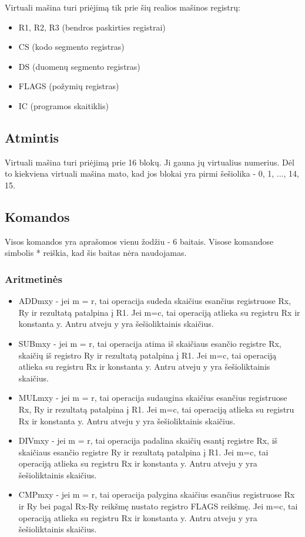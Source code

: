 \documentclass{VUMIFInfKursinis}
\begin{document}
Virtuali mašina turi priėjimą tik prie šių realios mašinos registrų:

\begin{itemize}
	\item R1, R2, R3 (bendros paskirties registrai)
	\item CS (kodo segmento registras)
	\item DS (duomenų segmento registras)
	\item FLAGS (požymių registras)
	\item IC (programos skaitiklis)
\end{itemize}

\subsection{Atmintis}

Virtuali mašina turi priėjimą prie 16 blokų. Ji gauna jų virtualius numerius. Dėl to kiekviena virtuali mašina mato, kad jos blokai yra pirmi šešiolika - 0, 1, ..., 14, 15.

\subsection{Komandos}

Visos komandos yra aprašomos vienu žodžiu - 6 baitais. Visose komandose simbolis * reiškia, kad šis baitas nėra naudojamas.

\subsubsection{Aritmetinės}
\begin{itemize}
	\item ADDmxy - jei m = r, tai operacija sudeda skaičius esančius registruose Rx, Ry ir rezultatą patalpina į R1. Jei m=c, tai operaciją atlieka su registru Rx ir konstanta y. Antru atveju y yra šešioliktainis skaičius.
	\item SUBmxy - jei m = r, tai operacija atima iš skaičiaus esančio registre Rx, skaičių iš registro Ry ir rezultatą patalpina į R1. Jei m=c, tai operaciją atlieka su registru Rx ir konstanta y. Antru atveju y yra šešioliktainis skaičius.
	\item MULmxy - jei m = r, tai operacija sudaugina skaičius esančius registruose Rx, Ry ir rezultatą patalpina į R1. Jei m=c, tai operaciją atlieka su registru Rx ir konstanta y. Antru atveju y yra šešioliktainis skaičius.
	\item DIVmxy - jei m = r, tai operacija padalina skaičių esantį registre Rx, iš skaičiaus esančio registre Ry ir rezultatą patalpina į R1. Jei m=c, tai operaciją atlieka su registru Rx ir konstanta y. Antru atveju y yra šešioliktainis skaičius.
	\item CMPmxy - jei m = r, tai operacija palygina skaičius esančius registruose Rx ir Ry bei pagal Rx-Ry reikšmę nustato registro FLAGS reikšmę. Jei m=c, tai operaciją atlieka su registru Rx ir konstanta y. Antru atveju y yra šešioliktainis skaičius.
\end{itemize}
\end{document}
